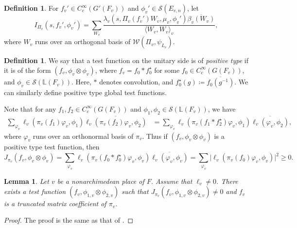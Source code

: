 \documentclass[11pt, reqno]{amsart}
\numberwithin{equation}{subsection}
\theoremstyle{plain}
\newtheorem{lem}[proposition]{Lemma}
\theoremstyle{definition}
\newtheorem{definition}[proposition]{Definition}
\newcommand{\LL}{\mathbb L}
\newcommand{\ol}{\overline}
\newcommand{\cS}{\mathcal S}
\newcommand{\W}{\mathcal W}
\begin{document}
\begin{definition}
    For $f_v' \in C_c^\infty(G'(F_v))$ and $\phi_v' \in \cS(E_{v,n})$, let
    \[
        I_{\Pi_v}(s, f_v', \phi_v')
        = \sum_{W_v} 
        \frac{\lambda_v(s, \Pi_v(f_v')W_v, \mu_v, \phi_v')\ol{\beta_v(W_v)}}
        {\langle W_v, W_v \rangle_v},
    \]
    where $W_v$ runs over an orthogonal basis
    of $\W(\Pi_v, \psi_{L_v})$. 
\end{definition}

\begin{definition}
\label{def:postype}
We say that a test function on the unitary side is of 
\emph{positive type} if it is of the form
$(f_v, \phi_v \otimes \phi_v)$, where $f_v =
f_0 \ast f_0^\star$ for some
$f_0 \in C_c^\infty(G(F_v))$, 
and $\phi_v \in \cS(\LL(F_v))$. 
Here, $\ast$ denotes convolution, and
$f_0^\star(g) \coloneqq \ol{f_0(g^{-1})}$.
We can similarly define positive type global test
functions.
\end{definition}


Note that for any $f_1, f_2 \in C_c^\infty(G(F_v))$ and
$\phi_1, \phi_2 \in \cS(\LL(F_v))$, we have
\begin{align*}
    \sum_{\varphi_v} \ell_v(\pi_v(f_1)\varphi_v, \phi_1)
    \ol{\ell_v(\pi_v(f_2)\varphi_v, \phi_2)}
    &= \sum_{\varphi_v} \ell_v(\pi_v(f_1\ast f_2^\star) \varphi_v, \phi_1)
    \ol{\ell_v(\varphi_v, \phi_2)},
\end{align*}
where $\varphi_v$ runs over an orthonormal basis
of $\pi_v$.
Thus if $(f_v, \phi_v \otimes \phi_v)$ is a positive
type test function, then
\begin{equation}
\label{eq:postype}
    J_{\pi_v}(f_v, \phi_v \otimes \phi_v)
    = \sum_{\varphi_v} 
    \ell_v(\pi_v(f_0 \ast f_0^\star)\varphi_v,
    \phi_v)\ol{\ell_v(\varphi_v, \phi_v)}
    = \sum_{\varphi_v}
    \lvert \ell_v(\pi_v(f_0)\varphi_v, \phi_v)\rvert^2
    \ge 0.
\end{equation}

\begin{lem}
\label{lem:matrixcoeff}
    Let $v$ be a nonarchimedean place of $F$.
    Assume that $\ell_v \neq 0$. There exists
    a test function $(f_v, \phi_{1,v} \otimes \phi_{2,v})$
    such that 
    $J_{\pi_v}(f_v, \phi_{1,v} \otimes \phi_{2,v}) \neq 0$ 
    and $f_v$ is a truncated matrix coefficient of $\pi_v$.
\end{lem}
\begin{proof}
The proof is the same as that of 
\cite[Lemma~6.14]{TGGP-Wang}.
\end{proof}
\end{document}
